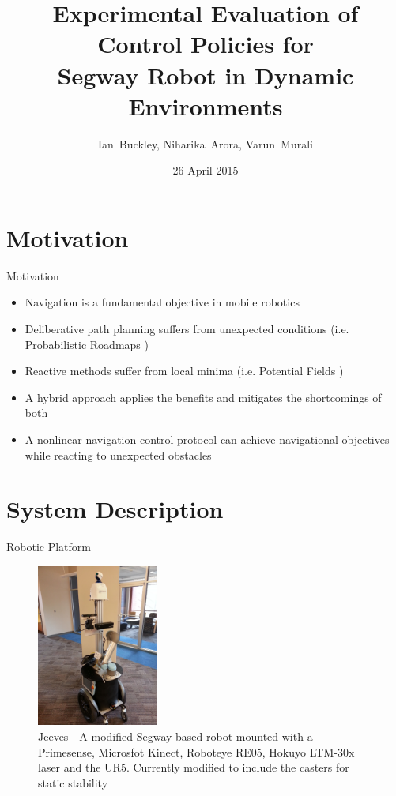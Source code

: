 \documentclass[10pt]{beamer}
\title{Experimental Evaluation of Control Policies for \\Segway Robot in Dynamic Environments }
\author{Ian~Buckley, Niharika~Arora, Varun~Murali}
\date{26 April 2015}
\institute{ECE 6552: Nonlinear System Project}
\begin{document}
\maketitle
\section{Motivation}
\begin{frame}{Motivation}
\begin{itemize}
\item<1-> Navigation is a fundamental objective in mobile robotics
\item<2-> Deliberative path planning suffers from unexpected conditions (i.e. Probabilistic Roadmaps \cite{kavraki1996}) 
\item<3-> Reactive methods suffer from local minima (i.e. Potential Fields \cite{khatib1985})
\item<4-> A hybrid approach applies the benefits and mitigates the shortcomings of both
\item<5-> A nonlinear navigation control protocol can achieve navigational objectives while reacting to unexpected obstacles 
\end{itemize}
\end{frame}

\section{System Description}
\begin{frame}{Robotic Platform}
\begin{figure}
    \centering
    \includegraphics[width = 4cm, scale=0.2]{jeeves2_0.jpg}
    \caption{Jeeves - A modified Segway based robot mounted with a Primesense, Microsfot Kinect, Roboteye RE05, Hokuyo LTM-30x laser and the UR5. Currently modified to include the casters for static stability
    \label{fig:jeeves}}
\end{figure}
\end{frame}
\end{document}
